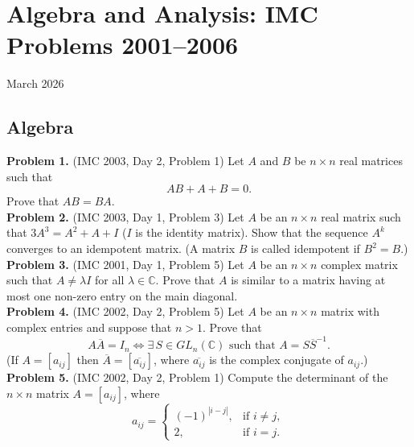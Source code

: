 \documentclass{article}
\begin{document}
\pagestyle{plain}

\section*{Algebra and Analysis: IMC Problems 2001--2006}

\begin{center}
March 2026
\end{center}

\subsection*{Algebra}

\textbf{Problem 1.} (IMC 2003, Day 2, Problem 1)
Let \( A \) and \( B \) be \( n \times n \) real matrices such that
\[
AB + A + B = 0.
\]
Prove that \( AB = BA \).
\\

\textbf{Problem 2.} (IMC 2003, Day 1, Problem 3)
Let \( A \) be an \( n \times n \) real matrix such that \( 3A^3 = A^2 + A + I \)
(\( I \) is the identity matrix). Show that the sequence \( A^k \) converges
to an idempotent matrix. (A matrix \( B \) is called idempotent if \( B^2 = B \).)
\\

\textbf{Problem 3.} (IMC 2001, Day 1, Problem 5)
Let \( A \) be an \( n \times n \) complex matrix such that \( A \neq \lambda I \) for all \( \lambda \in \mathbb{C} \). Prove that \( A \) is similar to a matrix having at most one non-zero entry on the main diagonal.
\\

\textbf{Problem 4.} (IMC 2002, Day 2, Problem 5)
Let \( A \) be an \( n \times n \) matrix with complex entries and suppose that \( n > 1 \). Prove that
\[
A\overline{A} = I_n \iff \exists\, S \in GL_n(\mathbb{C}) \text{ such that } A = S\overline{S}^{-1}.
\]
(If \( A = [a_{ij}] \) then \( \overline{A} = [\overline{a_{ij}}] \), where \( \overline{a_{ij}} \) is the complex conjugate of \( a_{ij} \).)
\\

\textbf{Problem 5.} (IMC 2002, Day 2, Problem 1)
Compute the determinant of the \( n \times n \) matrix \( A = [a_{ij}] \), where
\[
a_{ij} = \begin{cases} (-1)^{|i-j|}, & \text{if } i \neq j, \\ 2, & \text{if } i = j. \end{cases}
\]
\\
\end{document}
